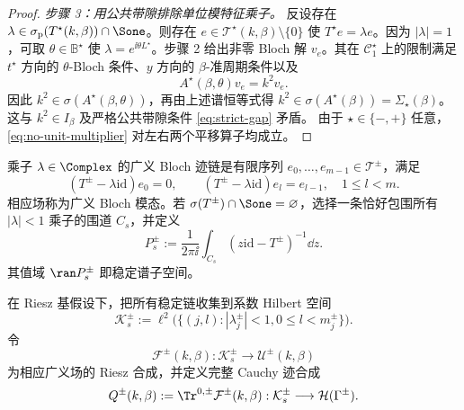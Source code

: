 \begin{proof}
\emph{步骤 3：用公共带隙排除单位模特征乘子。}
反设存在
$\lambda\in\sigma_{\mathrm p}(T^\star(k,\beta))\cap\Sone$。则存在
$e\in\mathscr T^\star(k,\beta)\setminus\{0\}$ 使
$T^\star e=\lambda e$。因为 $|\lambda|=1$，可取
$\theta\in\mathbb B^\star$ 使
$\lambda=e^{\ii\theta L^\star}$。步骤 2 给出非零 Bloch 解 $v_e$。其在
$\mathcal C_1^\star$ 上的限制满足 $t^\star$ 方向的
$\theta$-Bloch 条件、$y$ 方向的 $\beta$-准周期条件以及
\[
  A^\star(\beta,\theta)v_e=k^2v_e.
\]
因此 $k^2\in\sigma(A^\star(\beta,\theta))$，再由上述谱恒等式得
$k^2\in\sigma(A^\star(\beta))=\Sigma_\star(\beta)$。这与
$k^2\in I_\beta$ 及严格公共带隙条件 \eqref{eq:strict-gap} 矛盾。
由于 $\star\in\{-,+\}$ 任意，\eqref{eq:no-unit-multiplier} 对左右两个平移算子均成立。
\end{proof}

乘子 $\lambda\in\Complex$ 的广义 Bloch 迹链是有限序列 $e_0,\ldots,e_{m-1}\in\mathscr T^\pm$，满足
\begin{equation}
  (T^\pm-\lambda\mathrm{id})e_0=0,
  \qquad (T^\pm-\lambda\mathrm{id})e_l=e_{l-1},
  \quad 1\leq l<m.
  \label{eq:Jordan-chain}
\end{equation}
相应场称为广义 Bloch 模态。若 $\sigma(T^\pm)\cap\Sone=\varnothing$，选择一条恰好包围所有 $|\lambda|<1$ 乘子的围道 $C_s$，并定义
\begin{equation}
  P_s^\pm:=\frac{1}{2\pi\ii}\int_{C_s}(z\mathrm{id}-T^\pm)^{-1}\dd z.
  \label{eq:stable-projection}
\end{equation}
其值域 $\ran P_s^\pm$ 即稳定谱子空间。

在 Riesz 基假设下，把所有稳定链收集到系数 Hilbert 空间
\begin{equation}
  \mathcal K_s^\pm:=
  \ell^2\bigl(\{(j,l): |\lambda_j^\pm|<1,
  0\leq l<m_j^\pm\}\bigr).
  \label{eq:stable-coefficients}
\end{equation}
令
\begin{equation}
  \mathcal F^\pm(k,\beta):\mathcal K_s^\pm
  \longrightarrow\mathcal U^\pm(k,\beta)
  \label{eq:field-synthesis}
\end{equation}
为相应广义场的 Riesz 合成，并定义完整 Cauchy 迹合成
\begin{equation}
  Q^\pm(k,\beta):=\Tr^{0,\pm}\mathcal F^\pm(k,\beta):
  \mathcal K_s^\pm\longrightarrow\mathcal H(\Gamma^\pm).
  \label{eq:trace-synthesis}
\end{equation}

